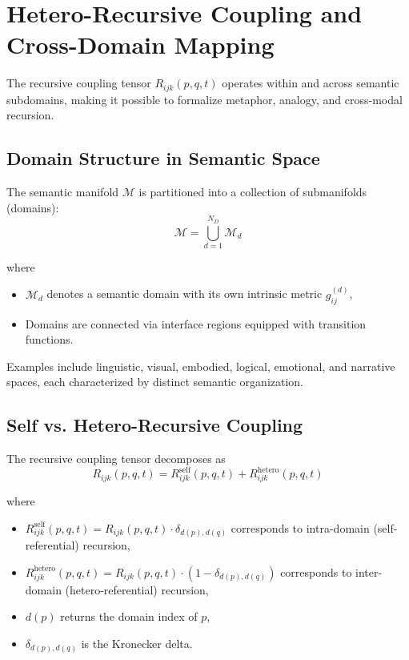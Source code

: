 \section{Hetero-Recursive Coupling and Cross-Domain Mapping}

The recursive coupling tensor \(R_{ijk}(p, q, t)\) operates within and across semantic subdomains, making it possible to formalize metaphor, analogy, and cross-modal recursion.

\subsection{Domain Structure in Semantic Space}

The semantic manifold \(\mathcal{M}\) is partitioned into a collection of submanifolds (domains):
\begin{equation}
\mathcal{M} = \bigcup_{d=1}^{N_D} \mathcal{M}_d
\end{equation}

where
\begin{itemize}
    \item \(\mathcal{M}_d\) denotes a semantic domain with its own intrinsic metric \(g_{ij}^{(d)}\),
    \item Domains are connected via interface regions equipped with transition functions.
\end{itemize}

Examples include linguistic, visual, embodied, logical, emotional, and narrative spaces, each characterized by distinct semantic organization.

\subsection{Self vs. Hetero-Recursive Coupling}

The recursive coupling tensor decomposes as
\begin{equation}
R_{ijk}(p, q, t) = R_{ijk}^{\text{self}}(p, q, t) + R_{ijk}^{\text{hetero}}(p, q, t)
\end{equation}

where
\begin{itemize}
    \item \(R_{ijk}^{\text{self}}(p, q, t) = R_{ijk}(p, q, t) \cdot \delta_{d(p),d(q)}\) corresponds to intra-domain (self-referential) recursion,
    \item \(R_{ijk}^{\text{hetero}}(p, q, t) = R_{ijk}(p, q, t) \cdot (1 - \delta_{d(p),d(q)})\) corresponds to inter-domain (hetero-referential) recursion,
    \item \(d(p)\) returns the domain index of \(p\),
    \item \(\delta_{d(p),d(q)}\) is the Kronecker delta.
\end{itemize}

